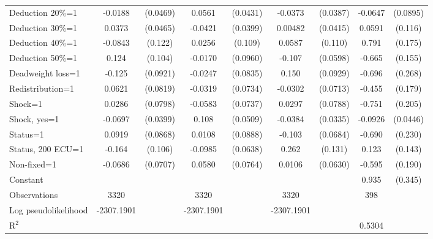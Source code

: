 \begin{tabular}{l|cccccc|cc}
Deduction 20\%=1&  -0.0188         & (0.0469)&   0.0561         & (0.0431)&  -0.0373         & (0.0387)&  -0.0647         & (0.0895)\\
Deduction 30\%=1&   0.0373         & (0.0465)&  -0.0421         & (0.0399)&  0.00482         & (0.0415)&   0.0591         &  (0.116)\\
Deduction 40\%=1&  -0.0843         &  (0.122)&   0.0256         &  (0.109)&   0.0587         &  (0.110)&    0.791\sym{***}&  (0.175)\\
Deduction 50\%=1&    0.124         &  (0.104)&  -0.0170         & (0.0960)&   -0.107\sym{*}  & (0.0598)&   -0.665\sym{***}&  (0.155)\\
Deadweight loss=1&   -0.125         & (0.0921)&  -0.0247         & (0.0835)&    0.150         & (0.0929)&   -0.696\sym{**} &  (0.268)\\
Redistribution=1&   0.0621         & (0.0819)&  -0.0319         & (0.0734)&  -0.0302         & (0.0713)&   -0.455\sym{**} &  (0.179)\\
Shock=1         &   0.0286         & (0.0798)&  -0.0583         & (0.0737)&   0.0297         & (0.0788)&   -0.751\sym{***}&  (0.205)\\
Shock, yes=1    &  -0.0697\sym{*}  & (0.0399)&    0.108\sym{**} & (0.0509)&  -0.0384         & (0.0335)&  -0.0926\sym{**} & (0.0446)\\
Status=1        &   0.0919         & (0.0868)&   0.0108         & (0.0888)&   -0.103         & (0.0684)&   -0.690\sym{***}&  (0.230)\\
Status, 200 ECU=1&   -0.164         &  (0.106)&  -0.0985         & (0.0638)&    0.262\sym{**} &  (0.131)&    0.123         &  (0.143)\\
Non-fixed=1     &  -0.0686         & (0.0707)&   0.0580         & (0.0764)&   0.0106         & (0.0630)&   -0.595\sym{***}&  (0.190)\\
Constant        &                  &         &                  &         &                  &         &    0.935\sym{***}&  (0.345)\\
\hline
Observations    &     3320         &         &     3320         &         &     3320         &         &      398         &         \\
Log pseudolikelihood  &  -2307.1901  &         &        -2307.1901           &         &   -2307.1901                &         &           &   \\ 
R$^2$      &                  &         &                  &         &                  &         &       0.5304    &   \\ 


\end{tabular}
